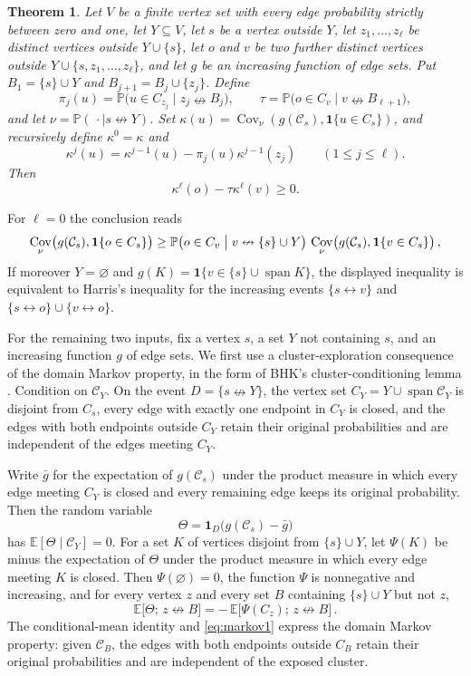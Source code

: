 \documentclass[11pt]{article}
\newtheorem{theorem}{Theorem}[section]
\theoremstyle{definition}
\theoremstyle{remark}
\newcommand{\PP}{\mathbb P}
\newcommand{\EE}{\mathbb E}
\newcommand{\one}{\mathbf 1}
\newcommand{\con}{\leftrightarrow}
\newcommand{\ncon}{\nleftrightarrow}
\newcommand{\eC}{\mathcal C}
\DeclareMathOperator{\Cov}{Cov}
\DeclareMathOperator{\spn}{span}
\begin{document}
\begin{theorem}\label{thm:csh}
Let $V$ be a finite vertex set with every edge probability strictly between zero and one, let
$Y\subseteq V$, let $s$ be a vertex outside $Y$, let $z_1,\dots,z_\ell$ be distinct
vertices outside $Y\cup\{s\}$, let $o$ and $v$ be two further distinct vertices outside
$Y\cup\{s,z_1,\dots,z_\ell\}$, and let $g$ be an increasing function of edge sets.
Put $B_1=\{s\}\cup Y$ and $B_{j+1}=B_j\cup\{z_j\}$. Define
\[
 \pi_j(u)=\PP\bigl(u\in C_{z_j}\mid z_j\ncon B_j\bigr),\qquad
 \tau=\PP\bigl(o\in C_v\mid v\ncon B_{\ell+1}\bigr),
\]
and let $\nu=\PP(\,\cdot\mid s\ncon Y)$. Set
$\kappa(u)=\Cov_\nu(g(\eC_s),\one\{u\in C_s\})$, and recursively define
$\kappa^0=\kappa$ and
\[
 \kappa^j(u)=\kappa^{j-1}(u)-\pi_j(u)\kappa^{j-1}(z_j)
 \qquad (1\leq j\leq\ell).
\]
Then
\[
 \kappa^\ell(o)-\tau\kappa^\ell(v)\geq0.
\]
\end{theorem}

For $\ell=0$ the conclusion reads
\[
 \Cov_\nu\bigl(g(\eC_s),\one\{o\in C_s\}\bigr)\geq
 \PP\bigl(o\in C_v\bigm|v\ncon\{s\}\cup Y\bigr)\,\Cov_\nu\bigl(g(\eC_s),\one\{v\in C_s\}\bigr)\,,
\]
If moreover $Y=\varnothing$ and
$g(K)=\one\{v\in\{s\}\cup\spn K\}$, the displayed inequality is equivalent to Harris's
inequality for the increasing events $\{s\con v\}$ and
$\{s\con o\}\cup\{v\con o\}$.

For the remaining two inputs, fix a vertex $s$, a set $Y$ not containing $s$, and an
increasing function $g$ of edge sets. We first use a cluster-exploration consequence of
the domain Markov property, in the form of BHK's cluster-conditioning lemma
\cite[Lemma~2.4]{BHK}. Condition on $\eC_Y$. On the event $D=\{s\ncon Y\}$, the vertex set
$C_Y=Y\cup\spn\eC_Y$ is disjoint from $C_s$, every edge with exactly one endpoint in
$C_Y$ is closed, and the edges with both endpoints outside $C_Y$ retain their original
probabilities and are independent of the edges
meeting $C_Y$.

Write $\bar g$ for the expectation of $g(\eC_s)$ under the product measure in which every
edge meeting $C_Y$ is closed and every remaining edge keeps its original probability. Then the random
variable
\begin{equation}\label{eq:resid}
 \Theta=\one_D\bigl(g(\eC_s)-\bar g\bigr)
\end{equation}
has $\EE[\Theta\mid\eC_Y]=0$. For a set $K$ of vertices disjoint from $\{s\}\cup Y$, let
$\Psi(K)$ be minus the expectation of $\Theta$ under the product measure in which every edge meeting
$K$ is closed. Then $\Psi(\varnothing)=0$, the function $\Psi$ is nonnegative and
increasing, and for every vertex $z$ and every set $B$ containing $\{s\}\cup Y$ but not $z$,
\begin{equation}\label{eq:markov1}
 \EE\bigl[\Theta;\,z\ncon B\bigr]=-\,\EE\bigl[\Psi(C_z);\,z\ncon B\bigr]\,.
\end{equation}
The conditional-mean identity and \eqref{eq:markov1} express the domain Markov property:
given $\eC_B$, the edges with both endpoints outside $C_B$ retain their original
probabilities and are independent of the exposed cluster.
\end{document}
